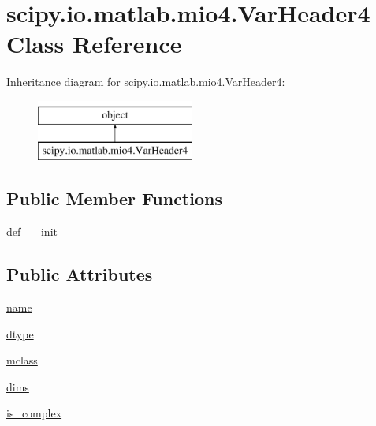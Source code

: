 \hypertarget{classscipy_1_1io_1_1matlab_1_1mio4_1_1VarHeader4}{}\section{scipy.\+io.\+matlab.\+mio4.\+Var\+Header4 Class Reference}
\label{classscipy_1_1io_1_1matlab_1_1mio4_1_1VarHeader4}
Inheritance diagram for scipy.\+io.\+matlab.\+mio4.\+Var\+Header4\+:\begin{figure}[H]
\begin{center}
\leavevmode
\includegraphics[height=2.000000cm]{classscipy_1_1io_1_1matlab_1_1mio4_1_1VarHeader4}
\end{center}
\end{figure}
\subsection*{Public Member Functions}
\begin{DoxyCompactItemize}
\item 
def \hyperlink{classscipy_1_1io_1_1matlab_1_1mio4_1_1VarHeader4_a8a06102c332b04c5edb2750ee22ddc73}{\+\_\+\+\_\+init\+\_\+\+\_\+}
\end{DoxyCompactItemize}
\subsection*{Public Attributes}
\begin{DoxyCompactItemize}
\item 
\hyperlink{classscipy_1_1io_1_1matlab_1_1mio4_1_1VarHeader4_afdfcafbfc626c9d59870fef901e6336e}{name}
\item 
\hyperlink{classscipy_1_1io_1_1matlab_1_1mio4_1_1VarHeader4_abc59ca6eff5552aa170bb916fa590fd6}{dtype}
\item 
\hyperlink{classscipy_1_1io_1_1matlab_1_1mio4_1_1VarHeader4_a91b52d1031518509055045ec9ecc1460}{mclass}
\item 
\hyperlink{classscipy_1_1io_1_1matlab_1_1mio4_1_1VarHeader4_a519f4740f17b1a3dd86ddef12fb81746}{dims}
\item 
\hyperlink{classscipy_1_1io_1_1matlab_1_1mio4_1_1VarHeader4_aedd8316043cee1dcc7a3c66c499680b2}{is\+\_\+complex}
\end{DoxyCompactItemize}
